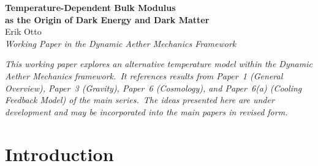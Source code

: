 \documentclass[12pt,letterpaper]{article}
\newcommand{\rhoa}{\rho_{\!A}}
\newcommand{\Ka}{K_{\!A}}
\newcommand{\etaK}{\eta_{\!K}}
\begin{document}
\begin{center}
{\LARGE\bfseries Temperature-Dependent Bulk Modulus\\
as the Origin of Dark Energy and Dark Matter}\\[1em]
{\large Erik Otto}\\[0.5em]
{\normalsize\itshape Working Paper in the Dynamic Aether Mechanics Framework}
\end{center}

\vspace{1em}

\begin{abstract}
Paper~6 identifies dark energy as the thermal pressure of hot void Aether
and dark matter as the two-fluid first-sound correction from an outward
temperature gradient.\ This working paper explores an alternative thermal
landscape in which matter-containing regions are \emph{warmer} than
voids---heated by viscous dissipation of gravitational inflow---while voids
cool adiabatically through expansion.\ If the Aether bulk modulus $\Ka$
increases with decreasing temperature (as the first-sound speed does in
superfluid helium-4), the wave speed $c = \sqrt{\Ka/\rhoa}$ is higher in
cold voids than near warm mass.\ On galactic scales, the outward-increasing
$c$ produces dark matter through the acoustic metric ($\Delta\Ka/\Ka \sim
4 \times 10^{-6}$).\ On cosmic scales, the growing $\Ka$ contrast from a
cooling cascade drives accelerating expansion ($\Delta\Ka/\Ka \sim 2 \times
10^{-4}$).\ A single parameter $\etaK \sim 10^{-4}$~K$^{-1}$---matching
the measured temperature sensitivity of helium-4 at low
temperature---governs both phenomena.\ The cascade naturally produces the
phantom-to-quintessence crossing observed by DESI.\ The local Aether
temperature at the Sun's position ($\sim$2.75~K) matches
$T_{\mathrm{CMB}}$ to within 1\%.
\end{abstract}

\vspace{1em}

\bigskip
\noindent\textit{This working paper explores an alternative temperature model
within the Dynamic Aether Mechanics framework.\ It references results from
Paper~1 (General Overview), Paper~3 (Gravity), Paper~6 (Cosmology), and
Paper~6(a) (Cooling Feedback Model) of the main series.\ The ideas presented
here are under development and may be incorporated into the main papers in
revised form.}
\bigskip


\section{Introduction}
\end{document}
